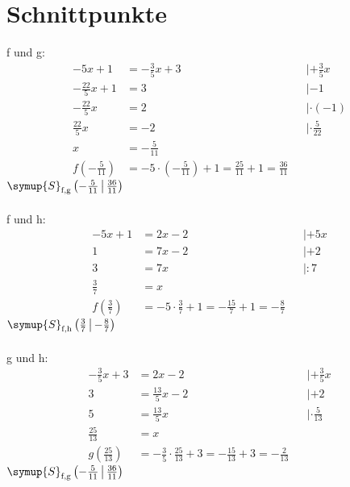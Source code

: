 \section*{Schnittpunkte}
f und g:
\begin{align}
    -5x + 1 &= -\frac{3}{5}x + 3 && | +\frac{3}{5}x \\
    -\frac{22}{5}x + 1 &= 3 && | -1 \\
    -\frac{22}{5}x &= 2 && | \cdot\!(-1) \\
    \frac{22}{5}x &= -2 && | \cdot\!\frac{5}{22} \\
    x &= -\frac{5}{11} \\
    f\left( -\frac{5}{11} \right) &= -5\cdot \left( -\frac{5}{11} \right) +1
        = \frac{25}{11} +1 = \frac{36}{11}
\end{align}
$\symup{S}_\text{f,g}\left(-\frac{5}{11}\,\middle|\,\frac{36}{11}\right)$\\\\
f und h:
\begin{align}
    -5x + 1 &= 2x - 2 && | +5x \\
    1 &= 7x - 2 && | +2 \\
    3 &= 7x && | :7 \\
    \frac{3}{7} &= x \\
    f\left(\frac{3}{7}\right) &= -5\cdot \frac{3}{7} +1
        = -\frac{15}{7} +1 = -\frac{8}{7}
\end{align}
$\symup{S}_\text{f,h}\left(\frac{3}{7}\,\middle|\,-\frac{8}{7}\right)$\\\\
g und h:
\begin{align}
    -\frac{3}{5}x + 3& = 2x - 2 && | +\frac{3}{5}x \\
    3 &= \frac{13}{5}x -2 && | +2 \\
    5 &= \frac{13}{5}x && | \cdot\!\frac{5}{13} \\
    \frac{25}{13} &= x \\
    g\left(\frac{25}{13}\right) &= -\frac{3}{5} \cdot \frac{25}{13} +3
        = -\frac{15}{13} +3 = -\frac{2}{13}
\end{align}
$\symup{S}_\text{f,g}\left(-\frac{5}{11}\,\middle|\,\frac{36}{11}\right)$


